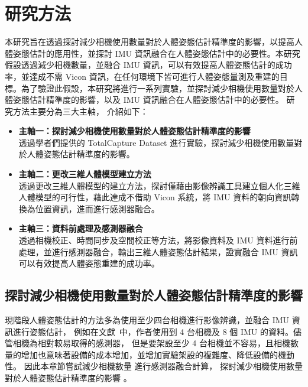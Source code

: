 \chapter{研究方法}
\fontsize{12pt}{18pt}\selectfont

本研究旨在透過探討減少相機使用數量對於人體姿態估計精準度的影響，以提高人體姿態估計的應用性，並探討 IMU 資訊融合在人體姿態估計中的必要性。本研究假設透過減少相機數量，並融合 IMU 資訊，可以有效提高人體姿態估計的成功率，並達成不需 Vicon 資訊，在任何環境下皆可進行人體姿態量測及重建的目標。為了驗證此假設，本研究將進行一系列實驗，並探討減少相機使用數量對於人體姿態估計精準度的影響，以及 IMU 資訊融合在人體姿態估計中的必要性。
研究方法主要分為三大主軸，
介紹如下：
\begin{itemize}
    \item \textbf{主軸一：探討減少相機使用數量對於人體姿態估計精準度的影響}
    \\ 透過學者們提供的 TotalCapture Dataset 進行實驗，探討減少相機使用數量對於人體姿態估計精準度的影響。
    \item \textbf{主軸二：更改三維人體模型建立方法}
    \\ 透過更改三維人體模型的建立方法，探討僅藉由影像辨識工具建立個人化三維人體模型的可行性，藉此達成不借助 Vicon 系統，將 IMU 資料的朝向資訊轉換為位置資訊，進而進行感測器融合。
    \item \textbf{主軸三：資料前處理及感測器融合}
    \\ 透過相機校正、時間同步及空間校正等方法，將影像資料及 IMU 資料進行前處理，並進行感測器融合，輸出三維人體姿態估計結果，證實融合 IMU 資訊可以有效提高人體姿態重建的成功率。
\end{itemize}


\clearpage

\section{探討減少相機使用數量對於人體姿態估計精準度的影響}
現階段人體姿態估計的方法多為使用至少四台相機進行影像辨識，並融合 IMU 資訊進行姿態估計，
例如在文獻~\cite{Zhang_2020_CVPR}中，作者使用到 4 台相機及 8 個 IMU 的資料。儘管相機為相對較易取得的感測器，
但是要架設至少 4 台相機並不容易，且相機數量的增加也意味著設備的成本增加，並增加實驗架設的複雜度、降低設備的機動性。
因此本章節嘗試減少相機數量
進行感測器融合計算，
探討減少相機使用數量對於人體姿態估計精準度的影響
。

